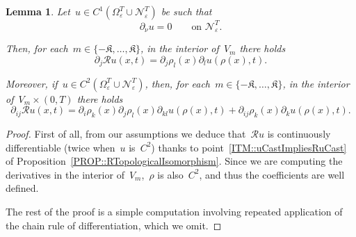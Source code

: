 \documentclass[12pt,a4paper]{amsart}
\numberwithin{equation}{section}
\newtheorem{lemma}[theorem]{Lemma}
\theoremstyle{definition}
\theoremstyle{remark}
\newcommand{\eps}{\varepsilon}
\begin{document}
\begin{lemma}\label{LEM::RuPartialDerivatives}
    Let~$u \in C^1(\Omega_\eps^T \cup \mathcal{N}_\eps^T)$ be such that
    \begin{equation}
        \partial_\nu u = 0 \qquad \text{on }\mathcal{N}_\eps^T.
    \end{equation}

    Then, for each~$m \in \{-\mathfrak{K},\dots,\mathfrak{K}\}$, in the interior of~$V_m$ there holds
    \begin{equation}\label{EQ::RuPartialDerivatives}
        \partial_j \mathcal{R}u(x,t) = \partial_j \rho_l (x) \partial_l u(\rho(x),t).
    \end{equation}

    Moreover, if~$u \in C^2(\Omega_\eps^T \cup \mathcal{N}_\eps^T)$, then, for each~$m \in \{-\mathfrak{K},\dots,\mathfrak{K}\}$, in the interior of~$V_m \times (0,T)$ there holds
    \begin{equation}\label{EQ::RuPartialSecondDerivatives}
        \partial_{ij} \mathcal{R}u(x,t) = \partial_i \rho_k (x) \partial_j \rho_l (x) \partial_{kl} u(\rho(x),t) + \partial_{ij} \rho_k (x) \partial_k u(\rho(x),t).
    \end{equation}
\end{lemma}
\begin{proof}
    First of all, from our assumptions we deduce that~$\mathcal{R}u$ is continuously differentiable (twice when~$u$ is~$C^2$) thanks to point~\ref{ITM::uCastImpliesRuCast} of Proposition~\ref{PROP::RTopologicalIsomorphism}. Since we are computing the derivatives in the interior of~$V_m$,~$\rho$ is also~$C^2$, and thus the coefficients are well defined.

    The rest of the proof is a simple computation involving repeated application of the chain rule of differentiation, which we omit.
\end{proof}
\end{document}
